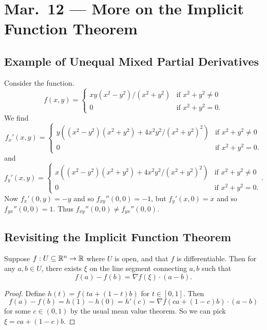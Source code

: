 \chapter{Mar.~12 --- More on the Implicit Function Theorem}

\section{Example of Unequal Mixed Partial Derivatives}

\begin{example}
  Consider the function.
  \[
    f(x, y) =
    \begin{cases}
      xy(x^2 - y^2) / (x^2 + y^2) & \text{if } x^2 + y^2 \ne 0 \\
      0 & \text{if } x^2 + y^2 = 0.
    \end{cases}
  \]
  We find
  \[
    f_x'(x, y) = \begin{cases}
      y((x^2 - y^2)(x^2 + y^2) + 4x^2 y^2 / (x^2 + y^2)^2) & \text{if } x^2 + y^2 \ne 0 \\
      0 & \text{if } x^2 + y^2 = 0.
    \end{cases}
  \]
  and
  \[
  f_y'(x, y) =
  \begin{cases}
    x((x^2 - y^2)(x^2 + y^2) + 4x^2 y^2 / (x^2 + y^2)^2) & \text{if } x^2 + y^2 \ne 0 \\
    0 & \text{if } x^2 + y^2 = 0.
  \end{cases}
  .\]
  Now $f_x'(0, y) = -y$ and so
  $f_{xy}''(0, 0) = -1$, but $f_y'(x, 0) = x$ and so
  $f_{yx}''(0, 0) = 1$.  Thus 
  $f_{xy}''(0, 0) \ne f_{yx}''(0, 0)$.
\end{example}

\section{Revisiting the Implicit Function Theorem}

\begin{theorem}
  Suppose $f : U \subseteq \mathbb{R}^n \to \mathbb{R}$ where $U$ is open,
  and that $f$ is differentiable. Then for any
  $a, b \in U$, there exists $\xi$ on the line segment
  connecting $a, b$ such that
  \[
    f(a) - f(b) = \nabla f(\xi) \cdot (a - b).
  \]
\end{theorem}

\begin{proof}
  Define $h(t) = f(ta + (1 - t)b)$ for $t \in [0, 1]$.
  Then
  \[
  f(a) - f(b) = h(1) - h(0) = h'(c)
  = \nabla f(ca + (1 - c)b) \cdot (a - b)
  \]
  for some $c \in (0, 1)$ by the usual mean value theorem.
  So we can pick $\xi = ca + (1 - c)b$.
\end{proof}

